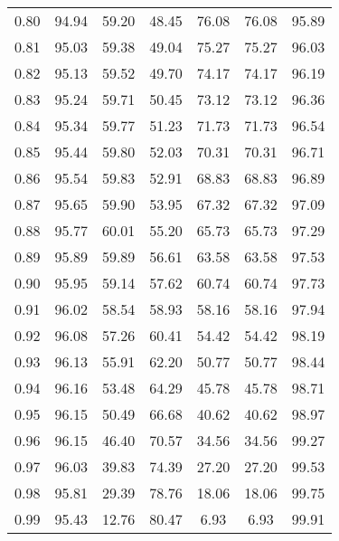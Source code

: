 \begin{tabular}{|c|c|c|c|c|c|c|}
      0.80 &     94.94 &     59.20 &      48.45 &   76.08 &      76.08 &         95.89 \\
      0.81 &     95.03 &     59.38 &      49.04 &   75.27 &      75.27 &         96.03 \\
      0.82 &     95.13 &     59.52 &      49.70 &   74.17 &      74.17 &         96.19 \\
      0.83 &     95.24 &     59.71 &      50.45 &   73.12 &      73.12 &         96.36 \\
      0.84 &     95.34 &     59.77 &      51.23 &   71.73 &      71.73 &         96.54 \\
      0.85 &     95.44 &     59.80 &      52.03 &   70.31 &      70.31 &         96.71 \\
      0.86 &     95.54 &     59.83 &      52.91 &   68.83 &      68.83 &         96.89 \\
      0.87 &     95.65 &     59.90 &      53.95 &   67.32 &      67.32 &         97.09 \\
      0.88 &     95.77 &     60.01 &      55.20 &   65.73 &      65.73 &         97.29 \\
      0.89 &     95.89 &     59.89 &      56.61 &   63.58 &      63.58 &         97.53 \\
      0.90 &     95.95 &     59.14 &      57.62 &   60.74 &      60.74 &         97.73 \\
      0.91 &     96.02 &     58.54 &      58.93 &   58.16 &      58.16 &         97.94 \\
      0.92 &     96.08 &     57.26 &      60.41 &   54.42 &      54.42 &         98.19 \\
      0.93 &     96.13 &     55.91 &      62.20 &   50.77 &      50.77 &         98.44 \\
      0.94 &     96.16 &     53.48 &      64.29 &   45.78 &      45.78 &         98.71 \\
      0.95 &     96.15 &     50.49 &      66.68 &   40.62 &      40.62 &         98.97 \\
      0.96 &     96.15 &     46.40 &      70.57 &   34.56 &      34.56 &         99.27 \\
      0.97 &     96.03 &     39.83 &      74.39 &   27.20 &      27.20 &         99.53 \\
      0.98 &     95.81 &     29.39 &      78.76 &   18.06 &      18.06 &         99.75 \\
      0.99 &     95.43 &     12.76 &      80.47 &    6.93 &       6.93 &         99.91 \\
\bottomrule
\end{tabular}
